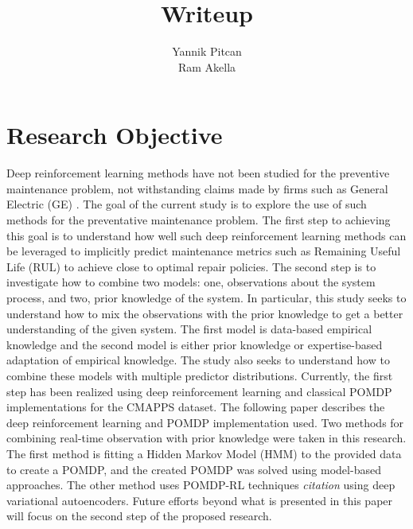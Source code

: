 \documentclass[english]{article}
\numberwithin{equation}{section}
\begin{document}
	
	\title{Writeup}
	
	\author{Yannik Pitcan \\
		Ram Akella
	}
	\maketitle
	
	\section*{Research Objective}
	Deep reinforcement learning methods have not been studied for the preventive maintenance problem, not withstanding claims made by firms such as General Electric (GE) \cite{GE}. The goal of the current study is to explore the use of such methods for the preventative maintenance problem.  The first step to achieving this goal is to understand how well such deep reinforcement learning methods can be leveraged to implicitly predict maintenance metrics such as Remaining Useful Life (RUL) to achieve close to optimal repair policies. The second step is to investigate how to combine two models: one, observations about the system process, and two, prior knowledge of the system. In particular, this study seeks to understand how to mix the observations with the prior knowledge to get a better understanding of the given system. The first model is data-based empirical knowledge and the second model is either prior knowledge or expertise-based adaptation of empirical knowledge. The study also seeks to understand how to combine these models with  multiple predictor distributions. Currently, the first step has been realized using deep reinforcement learning and classical POMDP implementations for the CMAPPS dataset. The following paper describes the deep reinforcement learning and POMDP implementation used. Two methods for combining real-time observation with prior knowledge were taken in this research. The first method is fitting a Hidden Markov Model (HMM) to the provided data to create a POMDP, and the created POMDP was solved using model-based approaches. The other method uses POMDP-RL techniques \textit{citation} using deep variational autoencoders.  Future efforts beyond what is presented in this paper will focus on the second step of the proposed research.
	
\end{document}
